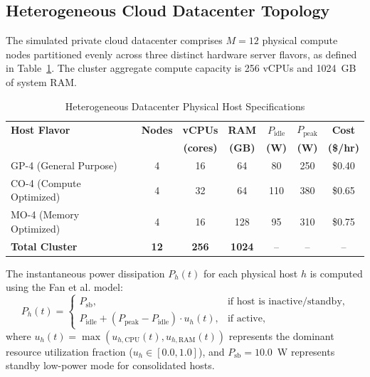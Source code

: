 \documentclass[conference]{IEEEtran}
\begin{document}
\subsection{Heterogeneous Cloud Datacenter Topology}
The simulated private cloud datacenter comprises $M=12$ physical compute nodes partitioned evenly across three distinct hardware server flavors, as defined in Table~\ref{tab:host_flavors}. The cluster aggregate compute capacity is 256 vCPUs and 1024~GB of system RAM.

\begin{table}[htbp]
\caption{Heterogeneous Datacenter Physical Host Specifications}
\label{tab:host_flavors}
\centering
\begin{tabular}{lcccccc}
\toprule
\textbf{Host Flavor} & \textbf{Nodes} & \textbf{vCPUs} & \textbf{RAM} & $P_{\text{idle}}$ & $P_{\text{peak}}$ & \textbf{Cost} \\
 & & \textbf{(cores)} & \textbf{(GB)} & \textbf{(W)} & \textbf{(W)} & \textbf{(\$/hr)} \\
\midrule
GP-4 (General Purpose)  & 4 & 16 & 64  & 80  & 250 & \$0.40 \\
CO-4 (Compute Optimized)& 4 & 32 & 64  & 110 & 380 & \$0.65 \\
MO-4 (Memory Optimized) & 4 & 16 & 128 & 95  & 310 & \$0.75 \\
\midrule
\textbf{Total Cluster} & \textbf{12} & \textbf{256} & \textbf{1024} & -- & -- & -- \\
\bottomrule
\end{tabular}
\end{table}

The instantaneous power dissipation $P_h(t)$ for each physical host $h$ is computed using the Fan et al. \cite{fan2007power} model:
\begin{equation}
P_h(t) = 
\begin{cases}
P_{\text{sb}}, & \text{if host is inactive/standby,} \\
P_{\text{idle}} + (P_{\text{peak}} - P_{\text{idle}}) \cdot u_h(t), & \text{if active,}
\end{cases}
\end{equation}
where $u_h(t) = \max(u_{h,\text{CPU}}(t), u_{h,\text{RAM}}(t))$ represents the dominant resource utilization fraction ($u_h \in [0.0, 1.0]$), and $P_{\text{sb}} = 10.0$~W represents standby low-power mode for consolidated hosts.
\end{document}
